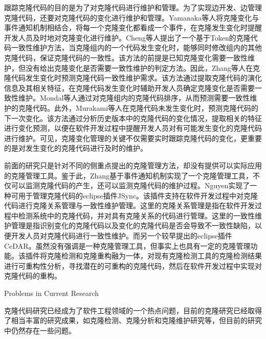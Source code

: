 跟踪克隆代码的目的是为了对克隆代码进行维护和管理。为了实现边开发、边管理克隆代码，还要对克隆代码的变化进行维护和管理。Yamanaka等人\cite{yamanaka2013applying}将克隆变化与事件通知机制相结合，将每一个克隆变化都看成一个事件，在克隆发生变化时提醒开发人员及时地对克隆变化进行维护。Cheng等人\cite{cheng2016rule}提出了一个基于Token的克隆代码一致性维护方法，当克隆组内的一个代码发生变化时，能够同时修改组内的其他克隆代码，保证克隆代码的一致性。该方法的前提是已知克隆变化需要一致性维护，但没有给出克隆变化是否需要一致性维护的判定方法。因此，Zhang等人\cite{zhang2016predicting}在克隆代码发生变化时预测克隆代码一致性维护需求。该方法通过提取克隆代码的演化信息及其相关特征，在克隆代码发生变化时辅助开发人员确定克隆变化是否需要一致性维护。Mondal等人通过对克隆组内的克隆代码排序，从而预测需要一致性维护的克隆代码\cite{mondal2014prediction}。此外，Murakami等人在克隆代码未发生变化时，预测克隆代码的下一次变化\cite{murakami2014predicting}。该方法通过分析历史版本中的克隆代码的变化情况，提取相关的特征进行变化预测，以便在软件开发过程中提醒开发人员对有可能发生变化的克隆代码进行维护。可见，克隆变化管理的关键不仅需要实时跟踪克隆代码的变化，更重要的是对发生变化的克隆代码进行及时的维护。

前面的研究只是针对不同的侧重点提出的克隆管理方法，却没有提供可以实际应用的克隆管理工具。鉴于此，Zhang基于事件通知机制实现了一个克隆管理工具，不仅可以监测克隆代码的产生，还可以监测克隆代码的维护过程\cite{zhang2013towards}。Nguyen实现了一种可用于管理克隆代码的eclipse插件JSync\cite{nguyen2012clone}。该插件支持在软件开发过程中对克隆代码进行克隆关系管理与一致性维护管理。这里的克隆关系管理是指在软件开发过程中检测系统中的克隆代码，并对具有克隆关系的代码进行管理。这里的一致性维护管理是指识别变化的克隆代码以及变化的克隆代码是否会导致不一致性缺陷，以便开发人员对克隆代码进行一致性维护。而另一个较早提出的eclipse插件CeDAR\cite{tairas2012increasing}。虽然没有强调是一种克隆管理工具，但事实上也具有一定的克隆管理功能。该插件将克隆检测和克隆重构融为一体，对现有克隆检测工具的克隆检测结果进行可重构性分析，寻找潜在的可重构的克隆代码，然后在软件开发过程中实现对克隆代码的重构。


{Problems in Current Research}

克隆代码研究已经成为了软件工程领域的一个热点问题，目前的克隆研究已经取得了相当丰富的研究成果，如克隆检测、克隆分析和克隆维护研究等，但目前的研究中仍然存在一些问题。

